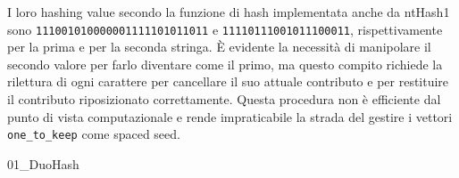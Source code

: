 \begin{example}
	I loro hashing value secondo la funzione di hash implementata anche da ntHash1 sono \verb|111001010000001111101011011| e \verb|11110111001011100011|, rispettivamente per la prima e per la seconda stringa. È evidente la necessità di manipolare il secondo valore per farlo diventare come il primo, ma questo compito richiede la rilettura di ogni carattere per cancellare il suo attuale contributo e per restituire il contributo riposizionato correttamente. Questa procedura non è efficiente dal punto di vista computazionale e rende impraticabile la strada del gestire i vettori \verb|one_to_keep| come spaced seed.
\end{example}

{01_DuoHash}
